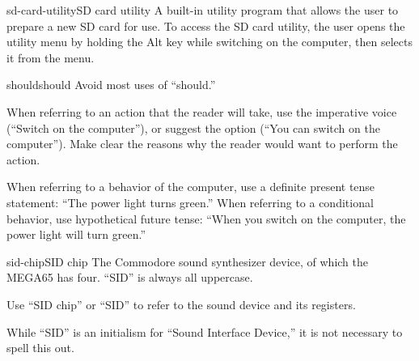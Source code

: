 \begin{sgentry}{sd-card-utility}{SD card utility}
    A built-in utility program that allows the user to prepare a new SD card for use. To access the SD card utility, the user opens the utility menu by holding the Alt key while switching on the computer, then selects it from the menu.
\end{sgentry}

\begin{sgentry}{should}{should}
    Avoid most uses of ``should.''

    When referring to an action that the reader will take, use the imperative voice (``Switch on the computer''), or suggest the option (``You can switch on the computer''). Make clear the reasons why the reader would want to perform the action.

    When referring to a behavior of the computer, use a definite present tense statement: ``The power light turns green.'' When referring to a conditional behavior, use hypothetical future tense: ``When you switch on the computer, the power light will turn green.''
\end{sgentry}

\begin{sgentry}{sid-chip}{SID chip}
    The Commodore sound synthesizer device, of which the MEGA65 has four. ``SID'' is always all uppercase.

    Use ``SID chip'' or ``SID'' to refer to the sound device and its registers.

    While ``SID'' is an initialism for ``Sound Interface Device,'' it is not necessary to spell this out.
\end{sgentry}

